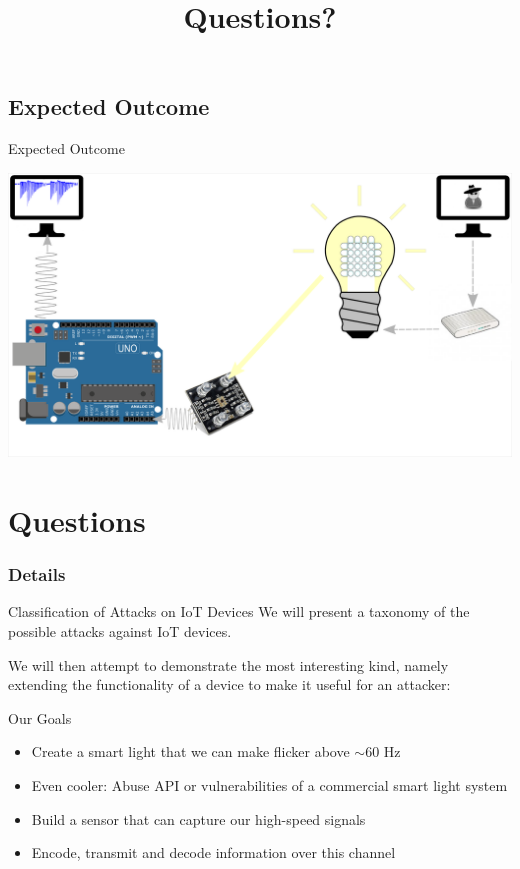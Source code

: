 \documentclass[11pt,t,usepdftitle=false,aspectratio=169]{beamer}
\begin{document}
\subsection{Expected Outcome}

\begin{frame}{Expected Outcome}
	\begin{center}
		\includegraphics{img/Aufbau_1.png}
	\end{center}
\end{frame}

\title{Questions?}
\subtitle{}
\section{Questions}


\appendix

\begin{frame}
\frametitle{Details}
    \begin{block}{Classification of Attacks on IoT Devices}
		We will present a taxonomy of the possible attacks against IoT devices.

		We will then attempt to demonstrate the most interesting kind, namely extending the functionality of a device to make it useful for an attacker:
	\end{block}
	\begin{block}{Our Goals}
		\begin{itemize}
			\item Create a smart light that we can make flicker above $\sim60$ Hz
			\item Even cooler: Abuse API or vulnerabilities of a commercial smart light system
			\item Build a sensor that can capture our high-speed signals
			\item Encode, transmit and decode information over this channel
		\end{itemize}
	\end{block}
\end{frame}
\end{document}
